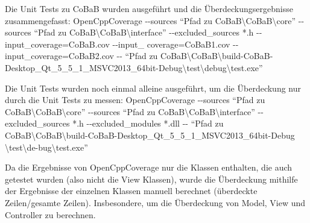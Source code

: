 Die Unit Tests zu CoBaB wurden ausgeführt und die Überdeckungsergebnisse zusammengefasst:\smallskip\newline
OpenCppCoverage 
-\hspace{1pt}-sources \enquote{Pfad zu CoBaB\textbackslash CoBaB\textbackslash core} 
-\hspace{1pt}-sources \enquote{Pfad zu CoBaB\textbackslash CoBaB\textbackslash interface} 
-\hspace{1pt}-excluded\_sources *.h -\hspace{1pt}-input\_coverage=CoBaB.cov -\hspace{1pt}-input\_ coverage=CoBaB1.cov -\hspace{1pt}-input\_coverage=CoBaB2.cov 
-\hspace{1pt}- \enquote{Pfad zu CoBaB\textbackslash CoBaB\textbackslash build-CoBaB-Desktop\_Qt\_5\_5\_1\_MSVC2013\_64bit-Debug\textbackslash test\textbackslash debug\textbackslash test.exe}
\newline
\par

Die Unit Tests wurden noch einmal alleine ausgeführt, um die Überdeckung nur durch die Unit Tests zu messen: \smallskip\newline
OpenCppCoverage 
-\hspace{1pt}-sources \enquote{Pfad zu CoBaB\textbackslash CoBaB\textbackslash core} 
-\hspace{1pt}-sources \enquote{Pfad zu CoBaB\textbackslash CoBaB\textbackslash interface} 
-\hspace{1pt}-excluded\_sources *.h 
-\hspace{1pt}-excluded\_modules *.dll
-\hspace{1pt}- \enquote{Pfad zu CoBaB\textbackslash CoBaB\textbackslash build-CoBaB-Desktop\_Qt\_5\_5\_1\_MSVC2013\_64bit-Debug \textbackslash test\textbackslash de-bug\textbackslash test.exe}
\par

Da die Ergebnisse von OpenCppCoverage nur die Klassen enthalten, die auch getestet wurden (also nicht die View Klassen), wurde die Überdeckung mithilfe der Ergebnisse der einzelnen Klassen manuell berechnet (überdeckte Zeilen/gesamte Zeilen). Insbesondere, um die Überdeckung von Model, View und Controller zu berechnen.